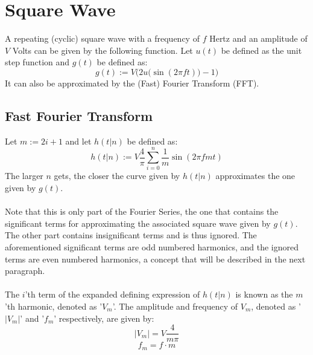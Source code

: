 \documentclass{article}
\begin{document}
	\section[Square]{Square Wave}
	A repeating (cyclic) square wave with a frequency of $f$ Hertz and an 
	amplitude of $V$ Volts can be given by the following function.  Let $u(t)$ 
	be defined as the unit step function and $g(t)$ be defined as:
	$$ g(t) := V\Big(2u\big(\sin (2 \pi f t)\big) - 1\Big)$$
	It can also be approximated by the (Fast) Fourier Transform (FFT).
	\subsection[FFT]{Fast Fourier Transform}
	Let $m := 2i + 1$ and let $h(t \vert n)$ be defined as:
	$$ h(t\vert n) := V \frac{4}{\pi} \sum_{i=0}^{n} \frac{1}{m} \sin (2 \pi f 
	m t)$$
	The larger $n$ gets, the closer the curve given by $h(t \vert n)$ 
	approximates the one given by $g(t)$. \\ \\
	Note that this is only part of the 
	Fourier Series, the one that contains the significant terms for 
	approximating the associated square wave given by $g(t)$.  The other part 
	contains insignificant terms and is thus ignored.  The aforementioned 
	significant terms are odd numbered harmonics, and the ignored terms are 
	even numbered harmonics, a concept that will be described in the next 
	paragraph.\\ \\
	The $i$'th term of the expanded defining expression of $h(t\vert n)$ is 
	known as the $m$'th harmonic, denoted as '$V_m$'.  The amplitude and 
	frequency of $V_m$, denoted as '$|V_m|$' and '$f_m$' respectively, are 
	given by:
	$$ |V_m| = V \frac{4}{m\pi} $$
	$$ f_m = f \cdot m$$
\end{document}
